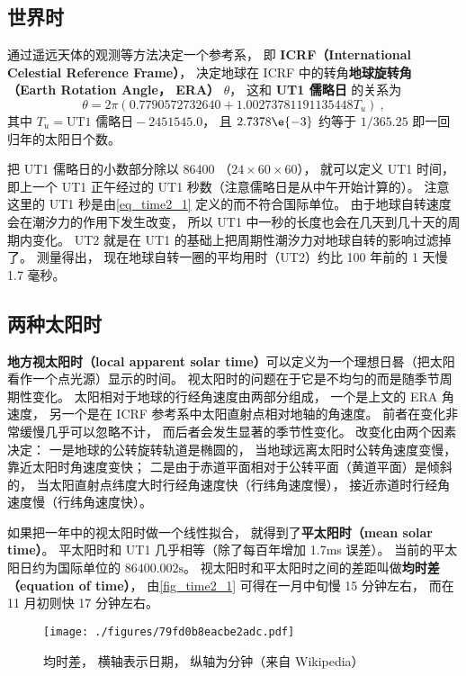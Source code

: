 

\subsection{世界时}
通过遥远天体的观测等方法决定一个参考系， 即 \textbf{ICRF（International Celestial Reference Frame）}， 决定地球在 ICRF 中的转角\textbf{地球旋转角（Earth Rotation Angle， ERA）} $\theta$， 这和 \textbf{UT1 儒略日} 的关系为
\begin{equation}\label{eq_time2_1}
\theta = 2\pi(0.7790572732640 + 1.00273781191135448 T_u)~,
\end{equation}
其中 $T_u = \text{UT1 儒略日} - 2451545.0$， 且 $2.7378\e{-3}$ 约等于 $1/365.25$ 即一回归年的太阳日个数。

把 UT1 儒略日的小数部分除以 86400 （$24\times 60\times 60$）， 就可以定义 UT1 时间， 即上一个 UT1 正午经过的 UT1 秒数（注意儒略日是从中午开始计算的）。 注意这里的 UT1 秒是由\autoref{eq_time2_1} 定义的而不符合国际单位。 由于地球自转速度会在潮汐力的作用下发生改变， 所以 UT1 中一秒的长度也会在几天到几十天的周期内变化。 UT2 就是在 UT1 的基础上把周期性潮汐力对地球自转的影响过滤掉了。 测量得出， 现在地球自转一圈的平均用时（UT2）约比 100 年前的 1 天慢 1.7 毫秒。

\subsection{两种太阳时}
\textbf{地方视太阳时（local apparent solar time）}可以定义为一个理想日晷（把太阳看作一个点光源）显示的时间。 视太阳时的问题在于它是不均匀的而是随季节周期性变化。 太阳相对于地球的行经角速度由两部分组成， 一个是上文的 ERA 角速度， 另一个是在 ICRF 参考系中太阳直射点相对地轴的角速度。 前者在变化非常缓慢几乎可以忽略不计， 而后者会发生显著的季节性变化。 改变化由两个因素决定： 一是地球的公转旋转轨道是椭圆的， 当地球远离太阳时公转角速度变慢， 靠近太阳时角速度变快； 二是由于赤道平面相对于公转平面（黄道平面）是倾斜的， 当太阳直射点纬度大时行经角速度快（行纬角速度慢）， 接近赤道时行经角速度慢（行纬角速度快）。

如果把一年中的视太阳时做一个线性拟合， 就得到了\textbf{平太阳时（mean solar time）}。 平太阳时和 UT1 几乎相等（除了每百年增加 1.7ms 误差）。 当前的平太阳日约为国际单位的 $86400.002\mathrm{s}$。 视太阳时和平太阳时之间的差距叫做\textbf{均时差（equation of time）}， 由\autoref{fig_time2_1} 可得在一月中旬慢 15 分钟左右， 而在 11 月初则快 17 分钟左右。

\begin{figure}[ht]
\centering
\texttt{[image: ./figures/79fd0b8eacbe2adc.pdf]}
\caption{均时差， 横轴表示日期， 纵轴为分钟（来自 Wikipedia）} \label{fig_time2_1}
\end{figure}
